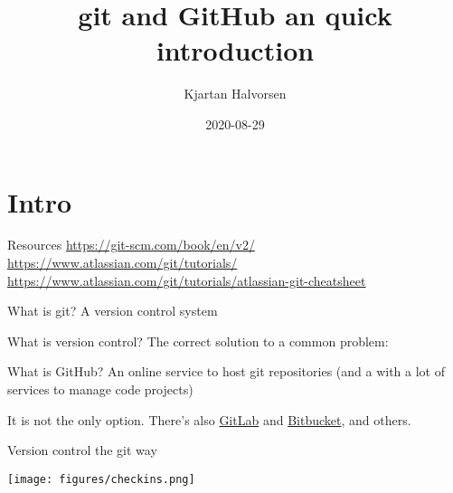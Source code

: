 \documentclass[presentation,aspectratio=1610]{beamer}
\author{Kjartan Halvorsen}
\date{2020-08-29}
\title{git and GitHub an quick introduction}
\begin{document}
\maketitle

\section{Intro}
\label{sec:org55ce358}
\begin{frame}[label={sec:org6f0d367}]{Resources}
\url{https://git-scm.com/book/en/v2/}
\url{https://www.atlassian.com/git/tutorials/}
\url{https://www.atlassian.com/git/tutorials/atlassian-git-cheatsheet}
\end{frame}

\begin{frame}[label={sec:orge821001}]{What is git?}
A version control system
\end{frame}

\begin{frame}[label={sec:org6888b33}]{What is version control?}
The \alert{correct} solution to a common problem:

       \begin{center}
       \end{center}
\end{frame}


\begin{frame}[label={sec:org3b29ae9}]{What is GitHub?}
An online service to host \alert{git} repositories (and a with a lot of services to manage code projects)

It is not the only option. There's also \href{https://about.gitlab.com/}{GitLab} and \href{https://bitbucket.org/product}{Bitbucket}, and others.
\end{frame}

\begin{frame}[label={sec:org49fca42}]{Version control the git way}
\begin{center}
\texttt{[image: figures/checkins.png]}
\end{center}
\end{frame}
\end{document}
